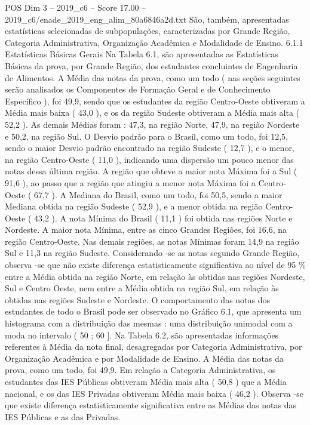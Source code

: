\begin{textsample}{POS Dim 3 – 2019\_c6 – Score 17.00 – 2019\_c6/enade\_2019\_eng\_alim\_80a6846a2d.txt}
São, também, apresentadas estatísticas selecionadas de subpopulações, caracterizadas por Grande Região, Categoria Administrativa, Organização Acadêmica e Modalidade de Ensino. 6.1.1 Estatísticas Básicas Gerais Na Tabela 6.1, são apresentadas as Estatísticas Básicas da prova, por Grande Região, dos estudantes concluintes de Engenharia de Alimentos.
A Média das notas da prova, como um todo ( nas seções seguintes serão analisados os Componentes de Formação Geral e de Conhecimento Específico ), foi 49,9, sendo que os estudantes da região Centro-Oeste obtiveram a Média mais baixa ( 43,0 ), e os da região Sudeste obtiveram a Média mais alta ( 52,2 ).
As demais Médias foram : 47,3, na região Norte, 47,9, na região Nordeste e 50,2, na região Sul.
O Desvio padrão para o Brasil, como um todo, foi 12,5, sendo o maior Desvio padrão encontrado na região Sudeste ( 12,7 ), e o menor, na região Centro-Oeste ( 11,0 ), indicando uma dispersão um pouco menor das notas dessa última região.
A região que obteve a maior nota Máxima foi a Sul ( 91,6 ), ao passo que a região que atingiu a menor nota Máxima foi a Centro-Oeste ( 67,7 ).
A Mediana do Brasil, como um todo, foi 50,5, sendo a maior Mediana obtida na região Sudeste ( 52,9 ), e a menor obtida na região Centro-Oeste ( 43,2 ).
A nota Mínima do Brasil ( 11,1 ) foi obtida nas regiões Norte e Nordeste.
A maior nota Mínima, entre as cinco Grandes Regiões, foi 16,6, na região Centro-Oeste.
Nas demais regiões, as notas Mínimas foram 14,9 na região Sul e 11,3 na região Sudeste.
Considerando -se as notas segundo Grande Região, observa -se que não existe diferença estatisticamente significativa ao nível de 95 \% entre a Média obtida na região Norte, em relação às obtidas nas regiões Nordeste, Sul e Centro Oeste, nem entre a Média obtida na região Sul, em relação às obtidas nas regiões Sudeste e Nordeste.
O comportamento das notas dos estudantes de todo o Brasil pode ser observado no Gráfico 6.1, que apresenta um histograma com a distribuição das mesmas : uma distribuição unimodal com a moda no intervalo ( 50 ; 60 ].
Na Tabela 6.2, são apresentadas informações referentes à Média da nota final, desagregadas por Categoria Administrativa, por Organização Acadêmica e por Modalidade de Ensino.
A Média das notas da prova, como um todo, foi 49,9.
Em relação a Categoria Administrativa, os estudantes das IES Públicas obtiveram Média mais alta ( 50,8 ) que a Média nacional, e os das IES Privadas obtiveram Média mais baixa ( 46,2 ).
Observa -se que existe diferença estatisticamente significativa entre as Médias das notas das IES Públicas e as das Privadas.

\end{textsample}
